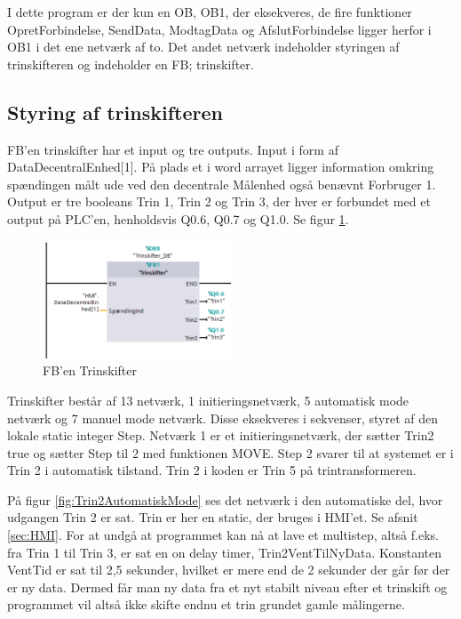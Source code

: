 I dette program er der kun en OB, OB1, der eksekveres, de fire funktioner OpretForbindelse, SendData, ModtagData og AfslutForbindelse ligger herfor i OB1 i det ene netværk af to. Det andet netværk indeholder styringen af trinskifteren og indeholder en FB; trinskifter.

\subsection{Styring af trinskifteren}

FB'en trinskifter har et input og tre outputs. Input i form af DataDecentralEnhed[1]. På plads et i word arrayet ligger information omkring spændingen målt ude ved den decentrale Målenhed også benævnt Forbruger 1. Output er tre booleans Trin 1, Trin 2 og Trin 3, der hver er forbundet med et output på PLC'en, henholdsvis Q0.6, Q0.7 og Q1.0. Se figur \ref{fig:PLCTrinskifter}.

\begin{figure}[H] %
	\centering
	\includegraphics[width=0.5\textwidth]{Figure/PLCTrinskifter}
	\caption{FB'en Trinskifter}
	\label{fig:PLCTrinskifter}
\end{figure}

Trinskifter består af 13 netværk, 1 initieringsnetværk, 5 automatisk mode netværk og 7 manuel mode netværk. Disse eksekveres i sekvenser, styret af den lokale static integer Step. Netværk 1 er et initieringsnetværk, der sætter Trin2 true og sætter Step til 2 med funktionen MOVE. Step 2 svarer til at systemet er i Trin 2 i automatisk tilstand. Trin 2 i koden er Trin 5 på trintransformeren.

På figur \ref{fig:Trin2AutomatiskMode} ses det netværk i den automatiske del, hvor udgangen Trin 2 er sat. Trin er her en static, der bruges i HMI'et. Se afsnit \ref{sec:HMI}. For at undgå at programmet kan nå at lave et multistep, altså f.eks. fra Trin 1 til Trin 3, er sat en on delay timer, Trin2VentTilNyData. Konstanten VentTid er sat til 2,5 sekunder, hvilket er mere end de 2 sekunder der går før der er ny data. Dermed får man ny data fra et nyt stabilt niveau efter et trinskift og programmet vil altså ikke skifte endnu et trin grundet gamle målingerne.

